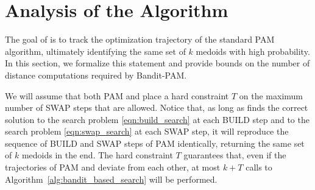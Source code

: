 
\section{Analysis of the Algorithm \label{sec:theory}}

The goal of \algname
is to track the optimization trajectory of the standard PAM algorithm, ultimately identifying the same set of $k$ medoids with high probability.
In this section, we formalize this statement
and provide bounds on the number of distance computations required by Bandit-PAM.


We will assume that both PAM and \algname place a hard constraint $T$ on the maximum number of SWAP steps that are allowed. 
Notice that, as long as \algname finds the correct solution to the search problem \eqref{eqn:build_search} at each BUILD step and to the search problem \eqref{eqn:swap_search} at each SWAP step, it will reproduce the sequence of BUILD and SWAP steps of PAM identically, returning the same set of $k$ medoids in the end.
% 
The hard constraint $T$ guarantees that, even if the trajectories of PAM and \algname deviate from each other, at most $k+T$ calls to Algorithm~\ref{alg:bandit_based_search} will be performed.

